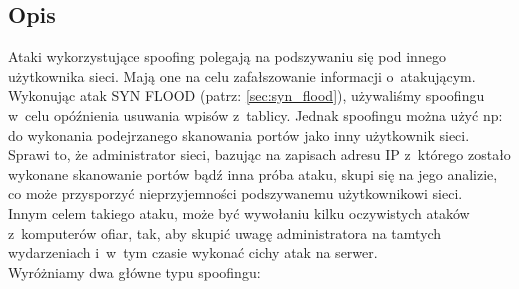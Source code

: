 \documentclass[a4paper,12pt,oneside]{book}
\begin{document}
		\subsection{Opis}
			Ataki wykorzystujące spoofing polegają na podszywaniu się pod innego użytkownika sieci.
			Mają one na celu zafałszowanie informacji o~atakującym.\\
			Wykonując atak SYN FLOOD (patrz: \ref{sec:syn_flood}), używaliśmy spoofingu w~celu opóźnienia usuwania wpisów z~tablicy.
			Jednak spoofingu można użyć np: do wykonania podejrzanego skanowania portów jako inny użytkownik sieci.
			Sprawi to, że administrator sieci, bazując na zapisach adresu IP z~którego zostało wykonane skanowanie portów bądź inna próba ataku, skupi się na jego analizie, co może przysporzyć nieprzyjemności podszywanemu użytkownikowi sieci.\\
			Innym celem takiego ataku, może być wywołaniu kilku oczywistych ataków z~komputerów ofiar, tak, aby skupić uwagę administratora na tamtych wydarzeniach i~w~tym czasie wykonać cichy atak na serwer.\\
			Wyróżniamy dwa główne typu spoofingu:
\end{document}
